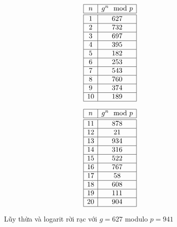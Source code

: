 \begin{figure}[H]
	\label{fg:tb3}
	\caption{Lũy thừa và logarit rời rạc với $g = 627$ modulo $p=941$}
	\begin{minipage}{0.4\textwidth}
		\begin{minipage}{0.4\textwidth}
			$$\begin{array}{|c|c|}
					\hline
					n  & g^n \mod p \\
					\hline
					\hline
					1  & 627        \\
					\hline
					2  & 732        \\
					\hline
					3  & 697        \\
					\hline
					4  & 395        \\
					\hline
					5  & 182        \\
					\hline
					6  & 253        \\
					\hline
					7  & 543        \\
					\hline
					8  & 760        \\
					\hline
					9  & 374        \\
					\hline
					10 & 189        \\
					\hline
				\end{array}$$
		\end{minipage}
		\hfill
		\begin{minipage}{0.4\textwidth}
			$$\begin{array}{|c|c|}
					\hline
					n  & g^n \mod p \\
					\hline
					\hline
					11 & 878        \\
					\hline
					12 & 21         \\
					\hline
					13 & 934        \\
					\hline
					14 & 316        \\
					\hline
					15 & 522        \\
					\hline
					16 & 767        \\
					\hline
					17 & 58         \\
					\hline
					18 & 608        \\
					\hline
					19 & 111        \\
					\hline
					20 & 904        \\
					\hline
				\end{array}$$
		\end{minipage}
	\end{minipage}
	\hfill
	\begin{minipage}{0.4\textwidth}
		\begin{minipage}{0.4\textwidth}

\end{minipage}
\end{minipage}
\end{figure}
